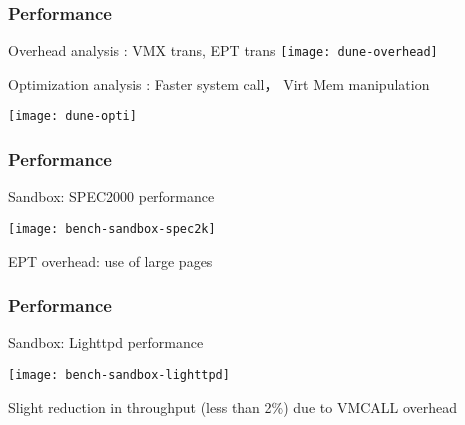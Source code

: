 \begin{frame}[plain]
	\frametitle{ Performance}
	 Overhead  analysis : VMX trans, EPT trans
	 \texttt{[image: dune-overhead]}
	
    Optimization analysis : Faster	 system	 call， Virt Mem manipulation
    
    \texttt{[image: dune-opti]}
	
\end{frame}



\begin{frame}[plain]
	\frametitle{ Performance}
	Sandbox:	 SPEC2000	 performance
	
	\texttt{[image: bench-sandbox-spec2k]}
	
	 EPT overhead: use of large pages
	

	
\end{frame}



\begin{frame}[plain]
	\frametitle{ Performance}
	Sandbox:	Lighttpd	
 performance	
  
	
	
	\texttt{[image: bench-sandbox-lighttpd]}
	
	 Slight	
 reduction	
 in	
 throughput	
 (less	
 than	
 2\%)	
 due	
 to	VMCALL	
 overhead	
  
	
	
	
	
\end{frame}


